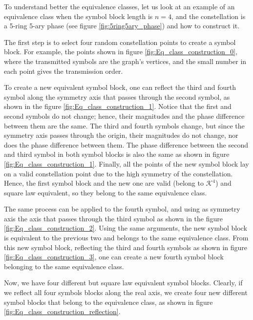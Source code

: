 To understand better the equivalence classes, let us look at an example of an equivalence class when the symbol block length is $n=4$, and the constellation is a 5-ring 5-ary phase (see figure \ref{fig:5ring5ary_phase}) and how to construct it.

The first step is to select four random constellation points to create a symbol block. For example, the points shown in figure \ref{fig:Eq_class_construction_0}, where the transmitted symbols are the graph's vertices, and the small number in each point gives the transmission order.

To create a new equivalent symbol block, one can reflect the third and fourth symbol along the symmetry axis that passes through the second symbol, as shown in the figure \ref{fig:Eq_class_construction_1}. Notice that the first and second symbols do not change; hence, their magnitudes and the phase difference between them are the same. The third and fourth symbols change, but since the symmetry axis passes through the origin, their magnitudes do not change, nor does the phase difference between them. The phase difference between the second and third symbol in both symbol blocks is also the same as shown in figure \ref{fig:Eq_class_construction_1}. Finally, all the points of the new symbol block lay on a valid constellation point due to the high symmetry of the constellation. Hence, the first symbol block and the new one are valid (belong to $\mathcal K^4$) and square law equivalent, so they belong to the same equivalence class.

The same process can be applied to the fourth symbol, and using as symmetry axis the axis that passes through the third symbol as shown in the figure \ref{fig:Eq_class_construction_2}. Using the same arguments, the new symbol block is equivalent to the previous two and belongs to the same equivalence class. From this new symbol block, reflecting the third and fourth symbols as shown in figure \ref{fig:Eq_class_construction_3}, one can create a new fourth symbol block belonging to the same equivalence class.

Now, we have four different but square law equivalent symbol blocks. Clearly, if we reflect all four symbols blocks along the real axis, we create four new different symbol blocks that belong to the equivalence class, as shown in figure \ref{fig:Eq_class_construction_reflection}.

